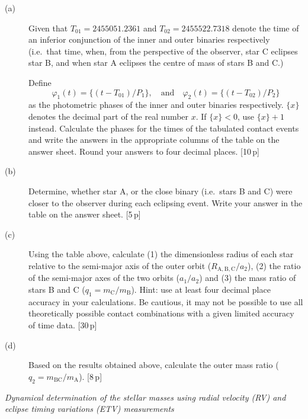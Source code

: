 \begin{description}
  \begin{description}
  \item[(a)] Given that $T_{01} = 2455051.2361$ and
    $T_{02} = 2455522.7318$ denote the time of an inferior conjunction of
    the inner and outer binaries respectively (i.e.\ that time, when, from
    the perspective of the observer, star C eclipses star B, and when star A
    eclipses the centre of mass of stars B and C.)

    Define
    \[ \varphi_1(t) = \{(t - T_{01})/P_1\}, \quad \mbox{and} \quad
       \varphi_2(t) = \{(t - T_{02})/P_2\} \]
    as the photometric phases of the inner and outer binaries respectively.
    $\{x\}$ denotes the decimal part of the real number $x$. If
    $\{x\} < 0$, use $\{x\} + 1$ instead. Calculate the phases for the times
    of the tabulated contact events and write the answers in the appropriate
    columns of the table on the answer sheet. Round your answers to four
    decimal places. \hfill[10\,p]
  \item[(b)] Determine, whether star A, or the close binary (i.e.\ stars B
    and C) were closer to the observer during each eclipsing event. Write
    your answer in the table on the answer sheet. \hfill[5\,p]
  \item[(c)] Using the table above, calculate (1) the dimensionless radius
    of each star relative to the semi-major axis of the outer orbit
    ($R_{\mathrm{A,B,C}}/a_2$), (2) the ratio of the semi-major axes of the
    two orbits ($a_1/a_2$) and (3) the mass ratio of stars B and C
    ($q_1 = m_{\mathrm{C}}/m_{\mathrm{B}}$). Hint: use at least four decimal
    place accuracy in your calculations. Be cautious, it may not be possible
    to use all theoretically possible contact combinations with a given
    limited accuracy of time data. \hfill[30\,p]
  \item[(d)] Based on the results obtained above, calculate the outer mass
    ratio ($q_2 = m_{\mathrm{BC}}/m_{\mathrm{A}}$). \hfill[8\,p]
  \end{description}

\item[ii.] \emph{Dynamical determination of the stellar masses using radial
  velocity (RV) and eclipse timing variations (ETV) measurements}


\end{description}
